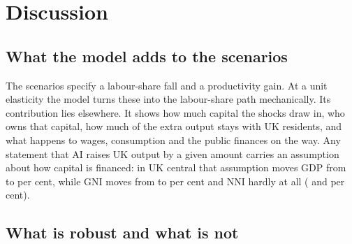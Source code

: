 \section{Discussion}
\label{sec:discussion}

\subsection{What the model adds to the scenarios}

The scenarios specify a labour-share fall and a productivity gain. At a unit elasticity the model turns these into the labour-share path mechanically. Its contribution lies elsewhere. It shows how much capital the shocks draw in, who owns that capital, how much of the extra output stays with UK residents, and what happens to wages, consumption and the public finances on the way. Any statement that AI raises UK output by a given amount carries an assumption about how capital is financed: in UK central that assumption moves \genHeadYear{} GDP from \genUkCentralMainGdpBoundShort{} to \genUkCentralMainGdpCentralShort{} per cent, while GNI moves from \genUkCentralMainGniBoundShort{} to \genUkCentralMainGniCentralShort{} per cent and NNI hardly at all (\genUkCentralMainNniBound{} and \genUkCentralMainNniCentral{} per cent).

\subsection{What is robust and what is not}

